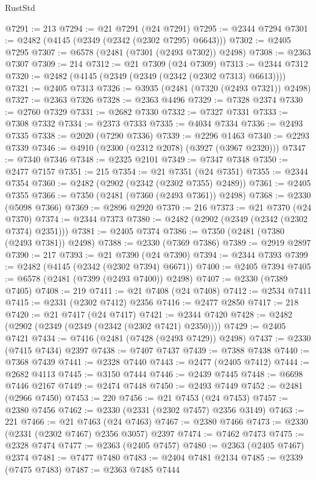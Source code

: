 \begin{lexlean}{RustStd}
\begin{coremodule}
@7291 := 213
@7294 := @21 @7291 (@24 @7291)
@7295 := @2344 @7294
@7301 := @2482 (@4145 (@2349 (@2342 (@2302 @7295) @6643)))
@7302 := @2405 @7295
@7307 := @6578 (@2481 (@7301 (@2493 @7302)) @2498)
@7308 := @2363 @7307
@7309 := 214
@7312 := @21 @7309 (@24 @7309)
@7313 := @2344 @7312
@7320 := @2482 (@4145 (@2349 (@2349 (@2342 (@2302 @7313) @6613))))
@7321 := @2405 @7313
@7326 := @3935 (@2481 (@7320 (@2493 @7321)) @2498)
@7327 := @2363 @7326
@7328 := @2363 @4496
@7329 := @7328 @2374
@7330 := @2760 @7329
@7331 := @2682 @7330
@7332 := @7327 @7331
@7333 := @7308 @7332
@7334 := @2373 @7333
@7335 := @4034 @7334
@7336 := @2493 @7335
@7338 := @2020 (@7290 @7336)
@7339 := @2296 @1463
@7340 := @2293 @7339
@7346 := @4910 (@2300 (@2312 @2078) (@3927 (@3967 @2320)))
@7347 := @7340 @7346
@7348 := @2325 @2101
@7349 := @7347 @7348
@7350 := @2477 @7157
@7351 := 215
@7354 := @21 @7351 (@24 @7351)
@7355 := @2344 @7354
@7360 := @2482 (@2902 (@2342 (@2302 @7355) @2489))
@7361 := @2405 @7355
@7366 := @7350 (@2481 (@7360 (@2493 @7361)) @2498)
@7368 := @2330 (@5098 @7366)
@7369 := @2896 @2920
@7370 := 216
@7373 := @21 @7370 (@24 @7370)
@7374 := @2344 @7373
@7380 := @2482 (@2902 (@2349 (@2342 (@2302 @7374) @2351)))
@7381 := @2405 @7374
@7386 := @7350 (@2481 (@7380 (@2493 @7381)) @2498)
@7388 := @2330 (@7369 @7386)
@7389 := @2919 @2897
@7390 := 217
@7393 := @21 @7390 (@24 @7390)
@7394 := @2344 @7393
@7399 := @2482 (@4145 (@2342 (@2302 @7394) @6671))
@7400 := @2405 @7394
@7405 := @6578 (@2481 (@7399 (@2493 @7400)) @2498)
@7407 := @2330 (@7389 @7405)
@7408 := 219
@7411 := @21 @7408 (@24 @7408)
@7412 := @2534 @7411
@7415 := @2331 (@2302 @7412) @2356
@7416 := @2477 @2850
@7417 := 218
@7420 := @21 @7417 (@24 @7417)
@7421 := @2344 @7420
@7428 := @2482 (@2902 (@2349 (@2349 (@2342 (@2302 @7421) @2350))))
@7429 := @2405 @7421
@7434 := @7416 (@2481 (@7428 (@2493 @7429)) @2498)
@7437 := @2330 (@7415 @7434) @2397
@7438 := @7407 @7437
@7439 := @7388 @7438
@7440 := @7368 @7439
@7441 := @2328 @7440
@7443 := @2477 (@2405 @7412)
@7444 := @2682 @4113
@7445 := @3150 @7444
@7446 := @2439 @7445
@7448 := @6698 @7446 @2167
@7449 := @2474 @7448
@7450 := @2493 @7449
@7452 := @2481 (@2966 @7450)
@7453 := 220
@7456 := @21 @7453 (@24 @7453)
@7457 := @2380 @7456
@7462 := @2330 (@2331 (@2302 @7457) @2356 @3149)
@7463 := 221
@7466 := @21 @7463 (@24 @7463)
@7467 := @2380 @7466
@7473 := @2330 (@2331 (@2302 @7467) @2356 @3057) @2397
@7474 := @7462 @7473
@7475 := @2328 @7474
@7477 := @2363 (@2405 @7457)
@7480 := @2363 (@2405 @7467) @2374
@7481 := @7477 @7480
@7483 := @2404 @7481 @2134
@7485 := @2339 (@7475 @7483)
@7487 := @2363 @7485 @7444

\end{coremodule}
\end{lexlean}
